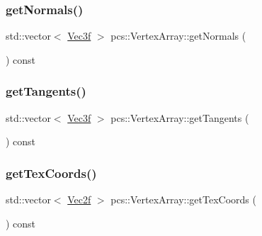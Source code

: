\subsubsection{\texorpdfstring{get\+Normals()}{getNormals()}}
{\footnotesize\ttfamily std\+::vector$<$ \hyperlink{namespacepcs_a68e0f517680976c17c810ffe6952cbab}{Vec3f} $>$ pcs\+::\+Vertex\+Array\+::get\+Normals (\begin{DoxyParamCaption}{ }\end{DoxyParamCaption}) const}

\mbox{\label{classpcs_1_1VertexArray_a8c12ef954189ff654c03c7c530044366}} 
\subsubsection{\texorpdfstring{get\+Tangents()}{getTangents()}}
{\footnotesize\ttfamily std\+::vector$<$ \hyperlink{namespacepcs_a68e0f517680976c17c810ffe6952cbab}{Vec3f} $>$ pcs\+::\+Vertex\+Array\+::get\+Tangents (\begin{DoxyParamCaption}{ }\end{DoxyParamCaption}) const}

\mbox{\label{classpcs_1_1VertexArray_aecbfa6183ef209e5add9a0ce0f6b2a92}} 
\subsubsection{\texorpdfstring{get\+Tex\+Coords()}{getTexCoords()}}
{\footnotesize\ttfamily std\+::vector$<$ \hyperlink{namespacepcs_a4b2fd718bd0800b6aa492b1c60f19edc}{Vec2f} $>$ pcs\+::\+Vertex\+Array\+::get\+Tex\+Coords (\begin{DoxyParamCaption}{ }\end{DoxyParamCaption}) const}

\mbox{\label{classpcs_1_1VertexArray_a1f81b5e5e7c5b56ffdb68d75bf7c9b21}} 
